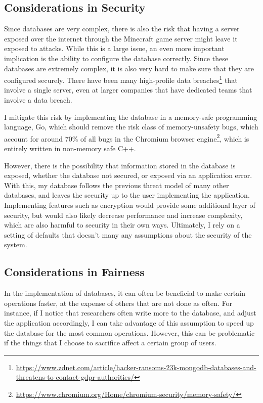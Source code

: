 \documentclass[10pt,twocolumn]{article}
\begin{document}
\subsection{Considerations in Security}

Since databases are very complex, there is also the risk that having a
server exposed over the internet through the Minecraft game server might leave
it exposed to attacks. While this is a large issue, an even more important
implication is the ability to configure the database correctly. Since these
databases are extremely complex, it is also very hard to make sure that they are
configured securely. There have been many high-profile data
breaches\footnote{\url{https://www.zdnet.com/article/hacker-ransoms-23k-mongodb-databases-and-threatens-to-contact-gdpr-authorities/}}
that involve a single server, even at larger companies that have dedicated teams
that involve a data breach.

I mitigate this risk by implementing the database in a memory-safe
programming language, Go, which should remove the risk class of memory-unsafety
bugs, which account for around 70\% of all bugs in the Chromium browser
engine\footnote{\url{https://www.chromium.org/Home/chromium-security/memory-safety/}},
which is entirely written in non-memory safe C++.

However, there is the possibility that information stored in the database is
exposed, whether the database not secured, or exposed via an application error.
With this, my database follows the previous threat model of many other
databases, and leaves the security up to the user implementing the application.
Implementing features such as encryption would provide some additional layer of
security, but would also likely decrease performance and increase complexity,
which are also harmful to security in their own ways. Ultimately, I rely on a
setting of defaults that doesn't many any assumptions about the security of the
system.

\subsection{Considerations in Fairness}

In the implementation of databases, it can often be beneficial to make certain
operations faster, at the expense of others that are not done as often. For
instance, if I notice that researchers often write more to the database, and
adjust the application accordingly, I can take advantage of this assumption to
speed up the database for the most common operations. However, this can be
problematic if the things that I choose to sacrifice affect a certain group of
users.
\end{document}
